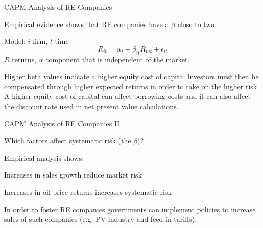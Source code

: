 {CAPM Analysis of RE Companies}
\item<1-> Empirical evidence shows that RE companies have a $\beta$ close to two.
\item<2-> Model: $i$ firm, $t$ time
$$
R_{it}= \alpha_i + \beta_{it} R_{mt}+\epsilon_{it}
$$
$R$ returns, $\alpha$ component that is independent of the market.
\item<3-> Higher beta values indicate a higher equity cost of capital.Investors must then be compensated
through higher expected returns in order to take on the higher risk. A higher equity cost of capital can affect borrowing costs and
it can also affect the discount rate used in net present value calculations.

{CAPM Analysis of RE Companies II}
\item<1-> Which factors affect systematic risk (the $\beta$)?
\item<2-> Empirical analysis shows:
\item Increases in sales growth reduce market risk
\item Increases in oil price returns increases systematic risk
\item<3-> In order to foster RE companies governments can implement policies to increase sales of such companies (e.g. PV-industry and feed-in tariffs).

